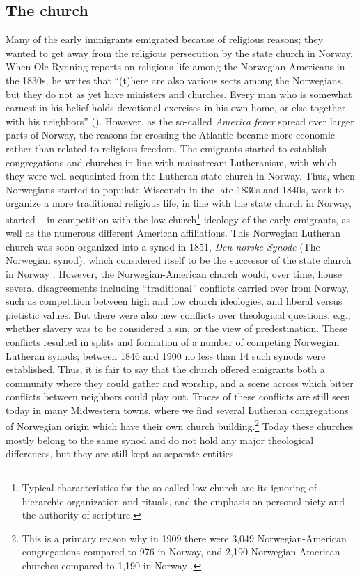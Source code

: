 \documentclass[output=paper]{langscibook}
\begin{document}
\subsection{The church}\label{sec:hjelde:6.1}
\begin{sloppypar}
Many of the early immigrants emigrated because of religious reasons; they wanted to get away from the religious persecution by the state church in Norway. When Ole Rynning reports on religious life among the Norwegian\hyp Americans in the 1830s, he writes that “(t)here are also various sects among the Norwegians, but they do not as yet have ministers and churches. Every man who is somewhat earnest in his belief holds devotional exercises in his own home, or else together with his neighbors” (\citealt[255]{Rynning1917}).  However, as the so-called \textit{America fever} spread over larger parts of Norway, the reasons for crossing the Atlantic became more economic rather than related to religious freedom. The emigrants started to establish congregations and churches in line with mainstream Lutheranism, with which they were well acquainted from the Lutheran state church in Norway. Thus, when Norwegians started to populate Wisconsin in the late 1830s and 1840s, work to organize a more traditional religious life, in line with the state church in Norway, started – in competition with the low church\footnote{Typical characteristics for the so-called low church are its ignoring of hierarchic organization and rituals, and the emphasis on personal piety and the authority of scripture.} ideology of the early emigrants, as well as the numerous different American affiliations. This Norwegian Lutheran church was soon organized into a synod in 1851, \textit{Den norske Synode} (The Norwegian synod), which considered itself to be the successor of the state church in Norway \citep[98]{Lovoll1984}. However, the Norwegian\hyp American church would, over time, house several disagreements including “traditional” conflicts carried over from Norway, such as competition between high and low church ideologies, and liberal versus pietistic values. But there were also new conflicts over theological questions, e.g., whether slavery was to be considered a sin, or the view of predestination. These conflicts resulted in splits and formation of a number of competing Norwegian Lutheran synods; between 1846 and 1900 no less than 14 such synods were established. Thus, it is fair to say that the church offered emigrants both a community where they could gather and worship, and a scene across which bitter conflicts between neighbors could play out. Traces of these conflicts are still seen today in many Midwestern towns, where we find several Lutheran congregations of Norwegian origin which have their own church building.\footnote{This is a primary reason why in 1909  there were 3,049 Norwegian\hyp American congregations compared to 976 in Norway, and 2,190 Norwegian\hyp American churches compared to 1,190 in Norway \citep[76--77]{Hempel2012}.}  Today these churches mostly belong to the same synod and do not hold any major theological differences, but they are still kept as separate entities. 
\end{sloppypar}
\end{document}
